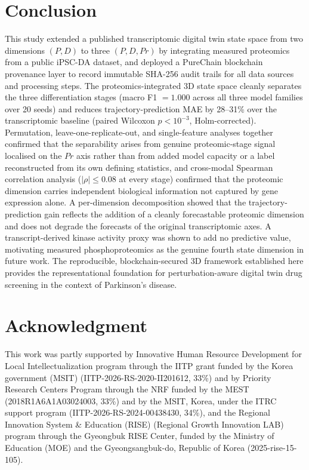 \documentclass[5p,times,twocolumn]{elsarticle}
\begin{document}
\section{Conclusion}
This study extended a published transcriptomic digital twin
state space from two dimensions $(P, D)$ to three
$(P, D, Pr)$ by integrating measured proteomics from a
public iPSC-DA dataset, and deployed a PureChain blockchain
provenance layer to record immutable SHA-256 audit trails
for all data sources and processing steps.
The proteomics-integrated 3D state space cleanly separates
the three differentiation stages (macro F1 $= 1.000$ across
all three model families over 20 seeds) and reduces
trajectory-prediction MAE by 28--31\% over the transcriptomic
baseline (paired Wilcoxon $p < 10^{-3}$, Holm-corrected).
Permutation, leave-one-replicate-out, and single-feature
analyses together confirmed that the separability arises from
genuine proteomic-stage signal localised on the $Pr$ axis
rather than from added model capacity or a label reconstructed
from its own defining statistics, and cross-modal Spearman
correlation analysis ($|\rho| \leq 0.08$ at every stage)
confirmed that the proteomic dimension carries independent
biological information not captured by gene expression alone.
A per-dimension decomposition showed that the trajectory-prediction
gain reflects the addition of a cleanly forecastable proteomic
dimension and does not degrade the forecasts of the original
transcriptomic axes.
A transcript-derived kinase activity proxy was shown to add
no predictive value, motivating measured phosphoproteomics
as the genuine fourth state dimension in future work.
The reproducible, blockchain-secured 3D framework
established here provides the representational foundation
for perturbation-aware digital twin drug screening in the
context of Parkinson's disease.
\section*{Acknowledgment}

This work was partly supported by Innovative Human Resource Development for Local Intellectualization program through the IITP grant funded by the Korea government (MSIT) (IITP-2026-RS-2020-II201612, 33\%) and by Priority Research Centers Program through the NRF funded by the MEST (2018R1A6A1A03024003, 33\%) and by the MSIT, Korea, under the ITRC support program (IITP-2026-RS-2024-00438430, 34\%),  and the Regional Innovation System \& Education (RISE) (Regional Growth Innovation LAB) program through the Gyeongbuk RISE Center, funded by the Ministry of Education (MOE) and the Gyeongsangbuk-do, Republic of Korea (2025-rise-15-105).


\small

\vspace{-0.3cm}

\vspace{-0.3cm}
\end{document}
